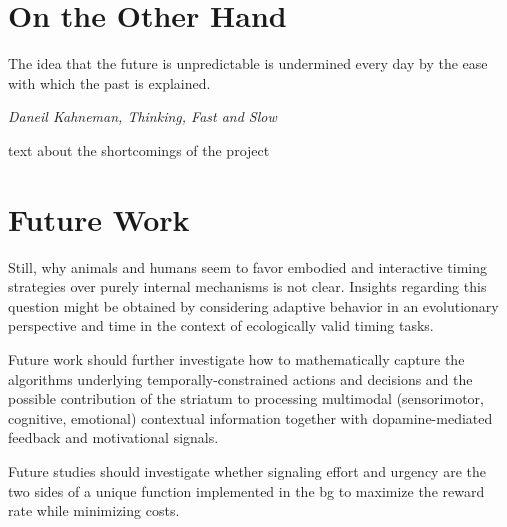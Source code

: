 \section{On the Other Hand}
\epigraph{The idea that the future is unpredictable is undermined every day by the ease with which the past is explained.}
{\textit{Daneil Kahneman, Thinking, Fast and Slow}}
\noindent
text about the shortcomings of the project

\section{Future Work}

Still, why animals and humans seem to favor embodied and interactive timing strategies over purely internal mechanisms is not clear.
Insights regarding this question might be obtained by considering adaptive behavior in an evolutionary perspective\cite{Cisek2019} and time in the context of ecologically valid timing tasks\cite{vanRijn2018}.


Future work should further investigate how to mathematically capture the algorithms underlying temporally-constrained actions and decisions and the possible contribution of the striatum to processing multimodal (sensorimotor, cognitive, emotional) contextual information together with dopamine-mediated feedback and motivational signals.


Future studies should investigate whether signaling effort and urgency are the two sides of a unique function implemented in the \gls{bg} to maximize the reward rate while minimizing costs.